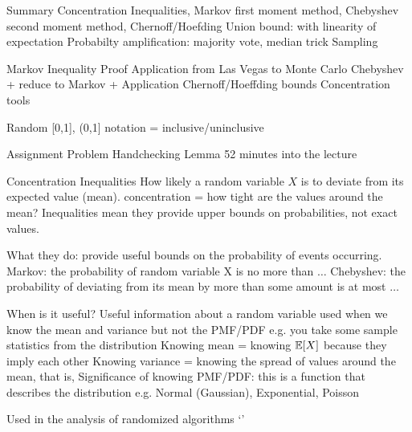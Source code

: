 Summary
Concentration Inequalities, Markov first moment method, Chebyshev second moment method, Chernoff/Hoefding
Union bound: with linearity of expectation
Probabilty amplification: majority vote, median trick
Sampling



Markov Inequality Proof
Application from Las Vegas to Monte Carlo 
Chebyshev + reduce to Markov + Application
Chernoff/Hoeffding bounds
Concentration tools


Random
[0,1], (0,1] notation = inclusive/uninclusive

Assignment
Problem Handchecking Lemma 52 minutes into the lecture

Concentration Inequalities
How likely a random variable $X$ is to deviate from its expected value (mean).
concentration = how tight are the values around the mean?
Inequalities mean they provide upper bounds on probabilities, not exact values.

What they do: provide useful bounds on the probability of events occurring.
Markov: the probability of random variable X is no more than $\dots$
Chebyshev: the probability of deviating from its mean by more than some amount is at most $\dots$

When is it useful?
Useful information about a random variable
used when we know the mean and variance but not the PMF/PDF e.g. you take some sample statistics from the distribution
Knowing mean = knowing $\mathbb{E}[X]$ because they imply each other
Knowing variance = knowing the spread of values around the mean, that is, 
Significance of knowing PMF/PDF: this is a function that describes the distribution e.g. Normal (Gaussian), Exponential, Poisson

Used in the analysis of randomized algorithms
`'